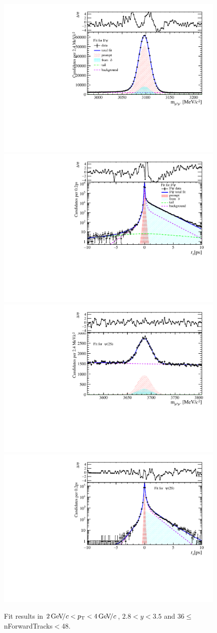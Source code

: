 \begin{figure}[H]
\begin{center}
\includegraphics[width=0.47\linewidth]{pdf/Jpsi/drawmassF/n4y2pt2.pdf}
\includegraphics[width=0.47\linewidth]{pdf/Jpsi/2DFitF/n4y2pt2.pdf}
\vspace*{-0.5cm}
\includegraphics[width=0.47\linewidth]{pdf/Psi2S/drawmassF/n4y2pt2.pdf}
\includegraphics[width=0.47\linewidth]{pdf/Psi2S/2DFitF/n4y2pt2.pdf}
\vspace*{-0.5cm}
\end{center}
\caption{Fit results in $2\text{\,Ge\kern -0.1em V\!/}c<p_{\mathrm{T}}<4\text{\,Ge\kern -0.1em V\!/}c$, $2.8<y<3.5$ and 36$\leq$nForwardTracks$<$48.}
\label{Fitn4y2pt2}
\end{figure}
